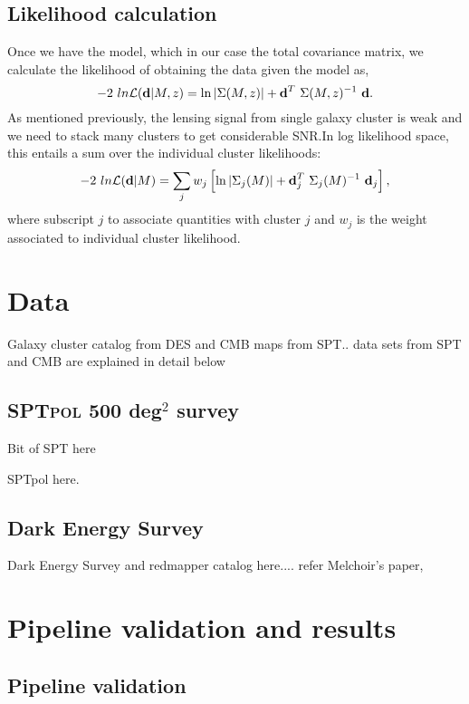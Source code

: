\documentclass[twocolumn]{aastex61}
\newcommand{\sptpol}{\textsc{SPTpol}}
\begin{document}
\subsection{Likelihood calculation}
Once we have the model, which in our case the total covariance matrix, we calculate the likelihood of obtaining the data given the model as,
\begin{equation}
-2\ ln \mathcal{L}(\textbf{\textrm{d}}|M,z) =  \ln\left| \Sigma(M,z) \right| + \textrm{\textbf{d}}^{T}\ \Sigma(M,z)^{-1}\  \textrm{\textbf{d}}.
\end{equation}
As mentioned previously, the lensing signal from single galaxy cluster is weak and we need to stack many clusters to get considerable SNR.In log likelihood space, this entails a sum over the individual cluster likelihoods:
\begin{equation}
-2\ ln \mathcal{L}(\textbf{\textrm{d}}|M) =  \sum_j w_j \left[\ln\left| \Sigma_j(M) \right| + \textrm{\textbf{d}}_j^{T}\ \Sigma_j(M)^{-1}\  \textrm{\textbf{d}}_j \right],
\label{eq_likelihood_MLE_stacked}
\end{equation}
where subscript $j$ to associate quantities with cluster $j$ and $w_{j}$ is the weight associated to individual cluster likelihood. 

\section{Data}\label{sec_data}

Galaxy cluster catalog from DES and CMB maps from SPT..
data sets from SPT and CMB are explained in detail below


\subsection{\sptpol{} {\rm 500} deg$^{2}$ survey}\label{sec_sptpol}
Bit of SPT here

SPTpol here.


\subsection{Dark Energy Survey}
Dark Energy Survey and redmapper catalog here.... refer Melchoir's paper, 



\section{Pipeline validation and results}
\subsection{Pipeline validation}
\end{document}
